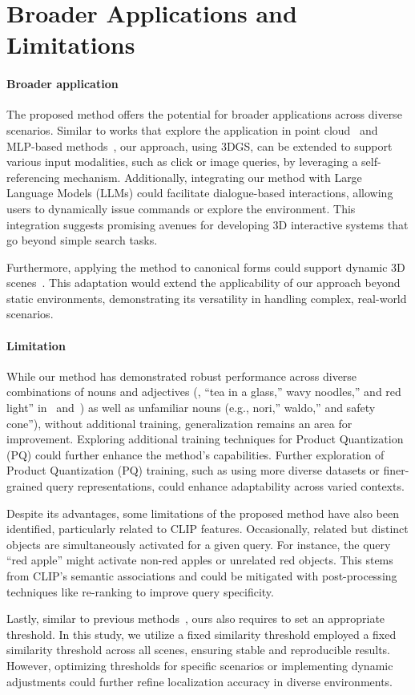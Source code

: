 \section{Broader Applications and Limitations}
\label{discussion}
\paragraph{Broader application}
The proposed method offers the potential for broader applications across diverse scenarios. 
Similar to works that explore the application in point cloud~\cite{concept_fusion, open_scene} and MLP-based methods~\cite{lerftogo2023}, our approach, using 3DGS, can be extended to support various input modalities, such as click or image queries, by leveraging a self-referencing mechanism. Additionally, integrating our method with Large Language Models (LLMs) could facilitate dialogue-based interactions, allowing users to dynamically issue commands or explore the environment.
This integration suggests promising avenues for developing 3D interactive systems that go beyond simple search tasks.

Furthermore, applying the method to canonical forms could support dynamic 3D scenes~\cite{deformable3dgs, gagaussian}. This adaptation would extend the applicability of our approach beyond static environments, demonstrating its versatility in handling complex, real-world scenarios.

\paragraph{Limitation}
While our method has demonstrated robust performance across diverse combinations of nouns and adjectives (\eg, ``tea in a glass,'' wavy noodles,'' and red light'' in~ and~) as well as unfamiliar nouns (e.g., nori,'' waldo,'' and safety cone''), without additional training, generalization remains an area for improvement. Exploring additional training techniques for Product Quantization (PQ) could further enhance the method’s capabilities. 
Further exploration of Product Quantization (PQ) training, such as using more diverse datasets or finer-grained query representations, could enhance adaptability across varied contexts.

Despite its advantages, some limitations of the proposed method have also been identified, particularly related to CLIP features. Occasionally, related but distinct objects are simultaneously activated for a given query. For instance, the query ``red apple'' might activate non-red apples or unrelated red objects. This stems from CLIP's semantic associations and could be mitigated with post-processing techniques like re-ranking to improve query specificity.

Lastly, similar to previous methods~\cite{langsplat, legaussian, open_gaussian}, ours also requires to set an appropriate threshold. In this study, we utilize a fixed similarity threshold employed a fixed similarity threshold across all scenes, ensuring stable and reproducible results. However, optimizing thresholds for specific scenarios or implementing dynamic adjustments could further refine localization accuracy in diverse environments.
